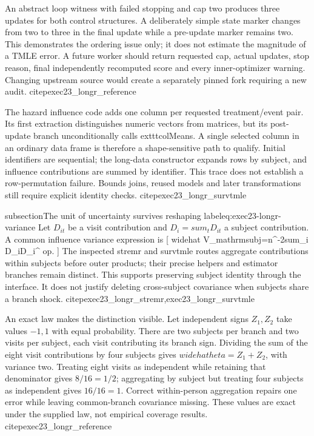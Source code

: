 An abstract loop witness with failed stopping and cap two produces three
updates for both control structures. A deliberately simple state marker
changes from two to three in the final update while a pre-update marker
remains two. This demonstrates the ordering issue only; it does not estimate
the magnitude of a TMLE error. A future worker should return requested cap,
actual updates, stop reason, final independently recomputed score and every
inner-optimizer warning. Changing upstream source would create a separately
pinned fork requiring a new audit. citep{exec23_longr_reference}

The hazard influence code adds one column per requested treatment/event pair.
Its first extraction distinguishes numeric vectors from matrices, but its
post-update branch unconditionally calls 	exttt{colMeans}. A single selected
column in an ordinary data frame is therefore a shape-sensitive path to
qualify. Initial identifiers are sequential; the long-data constructor expands
rows by subject, and influence contributions are summed by identifier. This
trace does not establish a row-permutation failure. Bounds joins, reused
models and later transformations still require explicit identity checks.
citep{exec23_longr_survtmle}

subsection{The unit of uncertainty survives reshaping}
label{eq:exec23-longr-variance}
Let $D_{it}$ be a visit contribution and $D_i=sum_t D_{it}$ a subject
contribution. A common influence variance expression is
[
 widehat V_{mathrm{subj}}=n^{-2}sum_i D_iD_i^	op.
]
The inspected stremr and survtmle routes aggregate contributions within
subjects before outer products; their precise helpers and estimator branches
remain distinct. This supports preserving subject identity through the
interface. It does not justify deleting cross-subject covariance when subjects
share a branch shock. citep{exec23_longr_stremr,exec23_longr_survtmle}

An exact law makes the distinction visible. Let independent signs $Z_1,Z_2$
take values $-1,1$ with equal probability. There are two subjects per branch
and two visits per subject, each visit contributing its branch sign. Dividing
the sum of the eight visit contributions by four subjects gives
$widehat	heta=Z_1+Z_2$, with variance two. Treating eight visits as independent
while retaining that denominator gives $8/16=1/2$; aggregating by subject but
treating four subjects as independent gives $16/16=1$. Correct within-person
aggregation repairs one error while leaving common-branch covariance missing.
These values are exact under the supplied law, not empirical coverage results.
citep{exec23_longr_reference}

